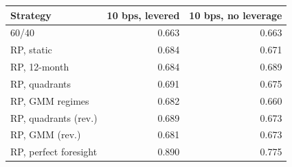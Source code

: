 \begin{tabular}{lrr}
\toprule
Strategy & 10 bps, levered & 10 bps, no leverage \\
\midrule
60/40 & 0.663 & 0.663 \\
RP, static & 0.684 & 0.671 \\
RP, 12-month & 0.684 & 0.689 \\
RP, quadrants & 0.691 & 0.675 \\
RP, GMM regimes & 0.682 & 0.660 \\
RP, quadrants (rev.) & 0.689 & 0.673 \\
RP, GMM (rev.) & 0.681 & 0.673 \\
RP, perfect foresight & 0.890 & 0.775 \\
\bottomrule
\end{tabular}
